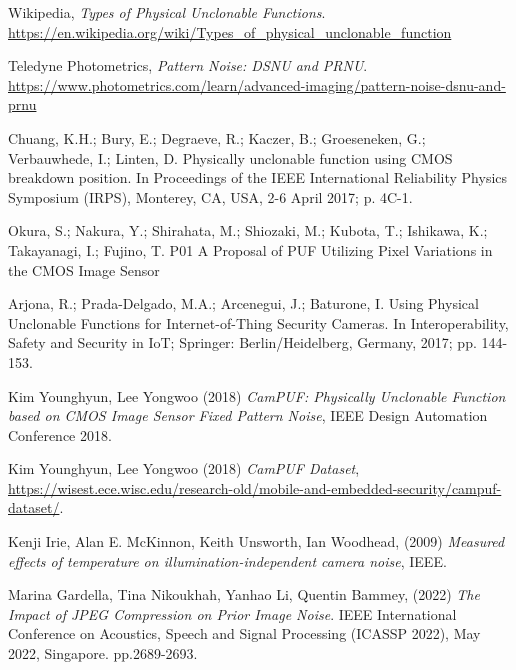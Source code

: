\begin{thebibliography}{9}

Wikipedia, \emph{Types of Physical Unclonable Functions}. \url{https://en.wikipedia.org/wiki/Types_of_physical_unclonable_function}

Teledyne Photometrics, \emph{Pattern Noise: DSNU and PRNU}. \url{https://www.photometrics.com/learn/advanced-imaging/pattern-noise-dsnu-and-prnu}

Chuang, K.H.; Bury, E.; Degraeve, R.; Kaczer, B.; Groeseneken, G.; Verbauwhede, I.; Linten, D. Physically unclonable function
using CMOS breakdown position. In Proceedings of the IEEE International Reliability Physics Symposium (IRPS), Monterey, CA,
USA, 2-6 April 2017; p. 4C-1.

Okura, S.; Nakura, Y.; Shirahata, M.; Shiozaki, M.; Kubota, T.; Ishikawa, K.; Takayanagi, I.; Fujino, T. P01 A Proposal of PUF
Utilizing Pixel Variations in the CMOS Image Sensor

Arjona, R.; Prada-Delgado, M.A.; Arcenegui, J.; Baturone, I. Using Physical Unclonable Functions for Internet-of-Thing Security
Cameras. In Interoperability, Safety and Security in IoT; Springer: Berlin/Heidelberg, Germany, 2017; pp. 144-153.

Kim Younghyun, Lee Yongwoo (2018) \emph{CamPUF: Physically Unclonable Function based on CMOS Image Sensor Fixed Pattern Noise}, IEEE Design Automation Conference 2018.

Kim Younghyun, Lee Yongwoo (2018) \emph{CamPUF Dataset}, \url{https://wisest.ece.wisc.edu/research-old/mobile-and-embedded-security/campuf-dataset/}.

Kenji Irie, Alan E. McKinnon, Keith Unsworth, Ian Woodhead, (2009) \emph{Measured effects of temperature on illumination-independent camera noise}, IEEE.

Marina Gardella, Tina Nikoukhah, Yanhao Li, Quentin Bammey, (2022) \emph{The Impact of JPEG Compression on Prior Image Noise}.  IEEE International Conference on Acoustics, Speech and Signal Processing (ICASSP 2022), May 2022, Singapore. pp.2689-2693.

\end{thebibliography}
